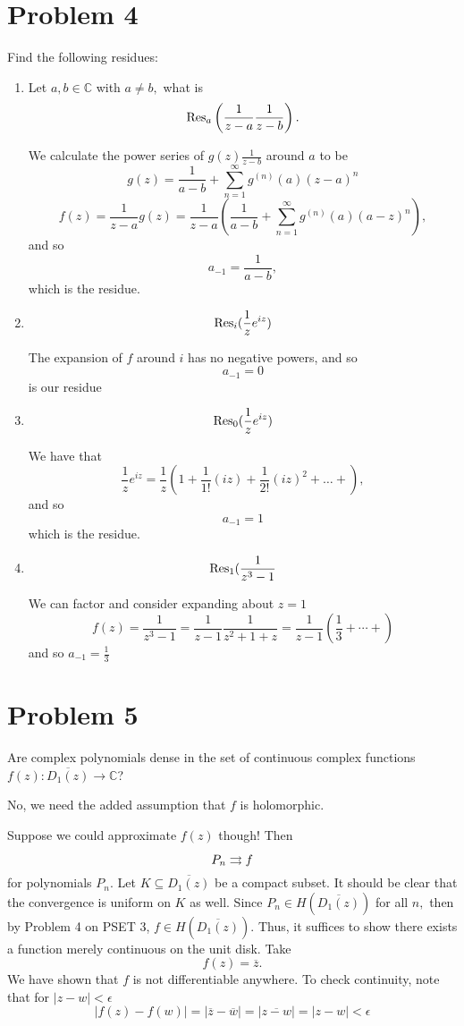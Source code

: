 \documentclass[11pt]{article}
\newcommand{\bbC}{\mathbb{C}}
\begin{document}
\section*{Problem 4}
\begin{problem}
    Find the following residues:
    \begin{enumerate}
        \item Let $a,b \in \bbC$ with $a\neq b,$ what is 
        \[\Res_a \left(\frac{1}{z - a}\frac{1}{z-b}\right).\]
        \begin{solution}
We calculate the power series of $g(z )\frac{1}{z-b}$ around $a$ to be 
\[g(z) = \frac{1}{a-b} + \sum_{n=1}^\infty g^{(n)}(a)(z-a)^n\]
\[f(z) = \frac{1}{z-a} g(z) = \frac{1}{z-a}\left(\frac{1}{a-b} + \sum_{n=1}^\infty g^{(n)}(a)(a - z)^n\right),\] and so 
\[a_{-1} = \frac{1}{a-b},\] which is the residue.
\end{solution}
\item 
\[\Res_i (\frac{1}{z}e^{iz})\]
\begin{solution}
The expansion of $f$ around $i$ has no negative powers, and so \[a_{-1} = 0\] is our residue
\end{solution}
\item 
\[\Res_0 (\frac{1}{z}e^{iz})\]
\begin{solution}
    We have that 
    \[\frac{1}{z}e^{iz} = \frac{1}{z}(1 + \frac{1}{1!} (iz)+ \frac{1}{2!}(iz)^2 + \dots + ),\] and so 
    \[a_{-1} = 1\] which is the residue. 
    \end{solution}
    \item 
\[\Res_1 (\frac{1}{z^3 - 1}\]
\begin{solution}
We can factor and consider expanding about $z = 1$ 
\[f(z) = \frac{1}{z^3 - 1} = \frac{1}{z-1}\frac{1}{z^2 + 1 + z} = \frac{1}{z-1}\left(\frac{1}{3} + \cdots + \right)\] and so $a_{-1} = \frac{1}{3}$
\end{solution}

    \end{enumerate}
\end{problem}

\section*{Problem 5}
\begin{problem}
    Are complex polynomials dense in the set of continuous complex functions $f(z): \overline{D_1(z)} \to \bbC$?
\end{problem}
\begin{solution}
No, we need the added assumption that $f$ is holomorphic. 

Suppose we could approximate $f(z)$ though! Then 
\[P_n\overset{}{\rightrightarrows} f\] for polynomials $P_n.$ Let $K \subseteq \overline{D_1(z)}$ be a compact subset. It should be clear that the convergence is uniform on $K$ as well. Since $P_n \in H(\overline{D_1(z)})$ for all $n,$ then by Problem 4 on PSET 3, $f \in H(\overline{D_1(z)}).$ Thus, it suffices to show there exists a function merely continuous on the unit disk. Take 
\[f(z) = \overline{z}.\] We have shown that $f$ is not differentiable anywhere. To check continuity, note that for $|z-w|< \epsilon$
\[|f(z) - f(w)| = |\overline{z} - \overline{w}| = |\overline{z - w}| = |z - w|< \epsilon\]
\end{solution}
\end{document}
